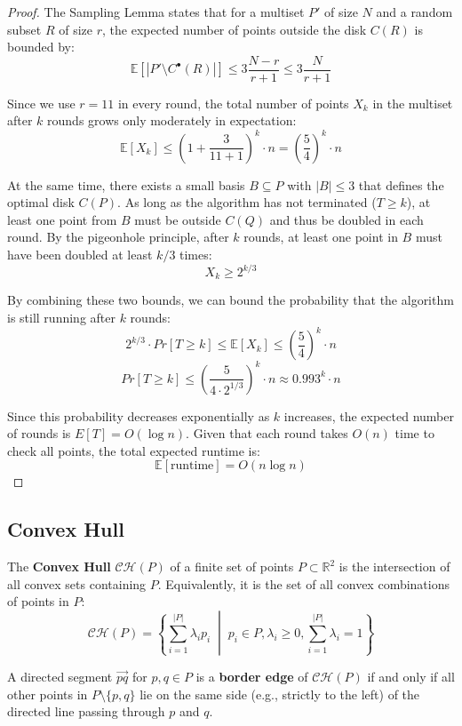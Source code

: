\begin{proof}
	The Sampling Lemma states that for a multiset $P'$ of size $N$ and a random subset $R$ of size $r$, the expected number of points outside the disk $C(R)$ is bounded by:
	$$\mathbb{E}[|P' \setminus C^{\bullet}(R)|] \le 3 \frac{N-r}{r+1} \le 3 \frac{N}{r+1}$$

	Since we use $r=11$ in every round, the total number of points $X_k$ in the multiset after $k$ rounds grows only moderately in expectation:
	$$\mathbb{E}[X_k] \le (1 + \frac{3}{11+1})^k \cdot n = (\frac{5}{4})^k \cdot n$$

	At the same time, there exists a small basis $B \subseteq P$ with $|B| \le 3$ that defines the optimal disk $C(P)$. As long as the algorithm has not terminated ($T \ge k$), at least one point from $B$ must be outside $C(Q)$ and thus be doubled in each round. By the pigeonhole principle, after $k$ rounds, at least one point in $B$ must have been doubled at least $k/3$ times:
	$$X_k \ge 2^{k/3}$$

	By combining these two bounds, we can bound the probability that the algorithm is still running after $k$ rounds:
	$$2^{k/3} \cdot Pr[T \ge k] \le \mathbb{E}[X_k] \le (\frac{5}{4})^k \cdot n$$
	$$Pr[T \ge k] \le \left( \frac{5}{4 \cdot 2^{1/3}} \right)^k \cdot n \approx 0.993^k \cdot n$$

	Since this probability decreases exponentially as $k$ increases, the expected number of rounds is $E[T] = O(\log n)$. Given that each round takes $O(n)$ time to check all points, the total expected runtime is:
	$$\mathbb{E}[\text{runtime}] = O(n \log n)$$
\end{proof}


\subsection{Convex Hull}

\begin{definition}
	The \textbf{Convex Hull} $\mathcal{CH}(P)$ of a finite set of points $P \subset \mathbb{R}^2$ is the intersection of all convex sets containing $P$. Equivalently, it is the set of all convex combinations of points in $P$:
	$$ \mathcal{CH}(P) = \left\{ \sum_{i=1}^{|P|} \lambda_i p_i \;\middle|\; p_i \in P, \lambda_i \ge 0, \sum_{i=1}^{|P|} \lambda_i = 1 \right\} $$
\end{definition}

\begin{definition}
	A directed segment $\vec{pq}$ for $p, q \in P$ is a \textbf{border edge} of $\mathcal{CH}(P)$ if and only if all other points in $P \setminus \{p, q\}$ lie on the same side (e.g., strictly to the left) of the directed line passing through $p$ and $q$.
\end{definition}

